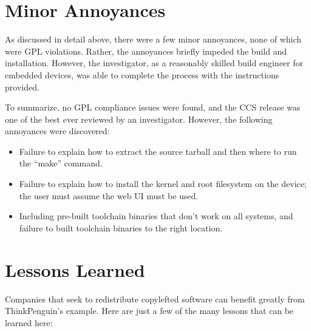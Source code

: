 \begin{enumerate}
\end{enumerate}

\section{Minor Annoyances}

As discussed in detail above, there were a few minor annoyances, none of
which were GPL violations.  Rather, the annoyances briefly impeded the
build and installation.  However, the investigator, as a reasonably skilled
build engineer for embedded devices, was able to complete the process with
the instructions provided.

To summarize, no GPL compliance issues were found, and the CCS release was
one of the best ever reviewed by an investigator.  However, the following
annoyances were discovered:

\begin{itemize}
\item Failure to explain how to extract the source tarball and then where to run the
  ``make'' command.
\item Failure to explain how to install the kernel and root filesystem on the
  device; the user must assume the web UI must be used.

\item Including pre-built toolchain binaries that don't work on all systems,
  and failure to built  toolchain binaries to the right location.
\end{itemize}

\section{Lessons Learned}

Companies that seek to redistribute copylefted software can benefit greatly
from ThinkPenguin's example.  Here are just a few of the many lessons that
can be learned here:

